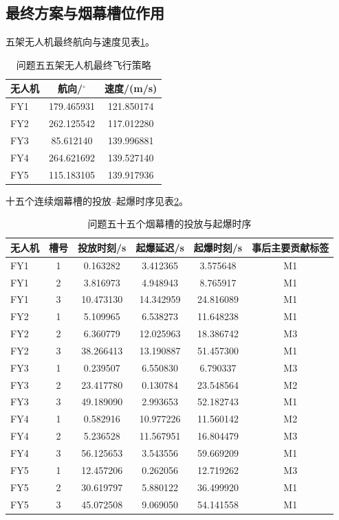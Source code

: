 \subsection{最终方案与烟幕槽位作用}
五架无人机最终航向与速度见表\ref{tab:q5-uav}。
\begin{table}[H]
\centering
\caption{问题五五架无人机最终飞行策略}
\label{tab:q5-uav}
\begin{tabular}{lcc}
\toprule
无人机 & 航向/$^\circ$ & 速度/(m/s) \\
\midrule
FY1 & 179.465931 & 121.850174 \\
FY2 & 262.125542 & 117.012280 \\
FY3 & 85.612140  & 139.996881 \\
FY4 & 264.621692 & 139.527140 \\
FY5 & 115.183105 & 139.917936 \\
\bottomrule
\end{tabular}
\end{table}

十五个连续烟幕槽的投放--起爆时序见表\ref{tab:q5-time}。
\begin{table}[tbp]
\centering
\caption{问题五十五个烟幕槽的投放与起爆时序}
\label{tab:q5-time}
\small
\begin{tabular}{lccccc}
\toprule
无人机 & 槽号 & 投放时刻/s & 起爆延迟/s & 起爆时刻/s & 事后主要贡献标签 \\
\midrule
FY1&1&0.163282&3.412365&3.575648&M1\\
FY1&2&3.816973&4.948943&8.765917&M1\\
FY1&3&10.473130&14.342959&24.816089&M1\\
FY2&1&5.109965&6.538273&11.648238&M1\\
FY2&2&6.360779&12.025963&18.386742&M3\\
FY2&3&38.266413&13.190887&51.457300&M1\\
FY3&1&0.239507&6.550830&6.790337&M3\\
FY3&2&23.417780&0.130784&23.548564&M2\\
FY3&3&49.189090&2.993653&52.182743&M1\\
FY4&1&0.582916&10.977226&11.560142&M2\\
FY4&2&5.236528&11.567951&16.804479&M3\\
FY4&3&56.125653&3.543556&59.669209&M1\\
FY5&1&12.457206&0.262056&12.719262&M3\\
FY5&2&30.619797&5.880122&36.499920&M1\\
FY5&3&45.072508&9.069050&54.141558&M1\\
\bottomrule
\end{tabular}
\end{table}

